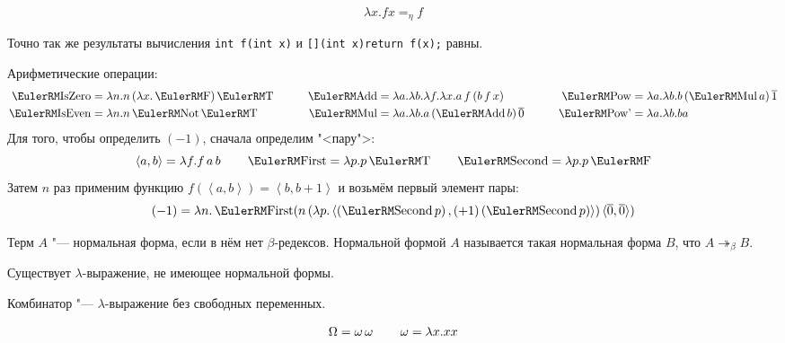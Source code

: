 \begin{definition}
    \[
        \lambda x . f x =_{\eta} f
    \]
\end{definition}
Точно так же результаты вычисления \texttt{int f(int x)} и \texttt{[](int x){return f(x);}} равны.

Арифметические операции:
\begin{align*}
    \func{IsZero} &= \lambda{}n.n\mathinner{(\lambda{}x.\F)}\T &\qquad
    \func{Add}    &= \lambda{}a.\lambda{}b.\lambda{}f.\lambda{}x.a \mathinner{f} (b \mathinner{f} x) &\qquad
    \func{Pow}    &= \lambda{}a.\lambda{}b.b \mathinner{(\func{Mul} a)} \mathinner{\overline{1}} \\
    \func{IsEven} &= \lambda{}n.n \Not \T &\qquad
    \func{Mul}    &= \lambda{}a.\lambda{}b.a \mathinner{(\func{Add} b)} \mathinner{\overline{0}} &\qquad
    \func{Pow'}   &= \lambda{}a.\lambda{}b.b a
\end{align*}
Для того, чтобы определить $(-1)$, сначала определим "<пару">:
\[
    \left<a,b\right> = \lambda f.f \mathinner{a} b \qquad
    \func{First} = \lambda p . p \T \qquad
    \func{Second} = \lambda p . p \F
\]%
Затем $n$ раз применим функцию $f\left(\left<a,b\right>\right) = \left<b,b+1\right>$ и возьмём первый элемент пары:
\[
    (-1) = \lambda n . \func{First}
        (n \mathinner{(\lambda p . \left<\left(\func{Second} p\right), \mathinner{(+1)} (\func{Second} p)\right>)}
        \langle\overline{0},\overline{0}\rangle)
\]

\begin{definition}
    Терм $A$ "--- нормальная форма, если в нём нет $\beta$-редексов.
    Нормальной формой $A$ называется такая нормальная форма $B$, что $A \twoheadrightarrow_{\beta} B$.
\end{definition}

\begin{statement}
    Существует $\lambda$-выражение, не имеющее нормальной формы.
\end{statement}

\begin{definition}[комбинатор]
    Комбинатор "--- $\lambda$-выражение без свободных переменных.
\end{definition}

\begin{definition}
\[
    \operatorname{\Omega} = \operatorname{\omega} \operatorname{\omega} \qquad
    \operatorname{\omega} = \lambda x . x x
\]
\end{definition}

